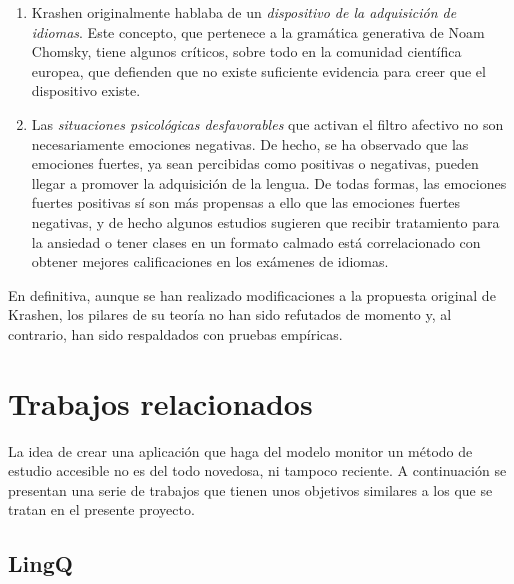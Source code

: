 \begin{enumerate}
	\item Krashen originalmente hablaba de un \textit{dispositivo de la adquisición de idiomas}. Este concepto, que pertenece a la gramática generativa de Noam Chomsky, tiene algunos críticos, sobre todo en la comunidad científica europea, que defienden que no existe suficiente evidencia para creer que el dispositivo existe. \todo[referencia]
	\item Las \textit{situaciones psicológicas desfavorables} que activan el filtro afectivo no son necesariamente emociones negativas. De hecho, se ha observado que las emociones fuertes, ya sean percibidas como positivas o negativas, pueden llegar a promover la adquisición de la lengua. De todas formas, las emociones fuertes positivas sí son más propensas a ello que las emociones fuertes negativas, y de hecho algunos estudios sugieren que recibir tratamiento para la ansiedad o tener clases en un formato calmado está correlacionado con obtener mejores calificaciones en los exámenes de idiomas. \autocite{MacIntyre}
\end{enumerate}



En definitiva, aunque se han realizado modificaciones a la propuesta original de Krashen, los pilares de su teoría no han sido refutados de momento y, al contrario, han sido respaldados con pruebas empíricas.



\section{Trabajos relacionados}

La idea de crear una aplicación que haga del modelo monitor un método de estudio accesible no es del todo novedosa, ni tampoco reciente. A continuación se presentan una serie de trabajos que tienen unos objetivos similares a los que se tratan en el presente proyecto.

\subsection{LingQ}

